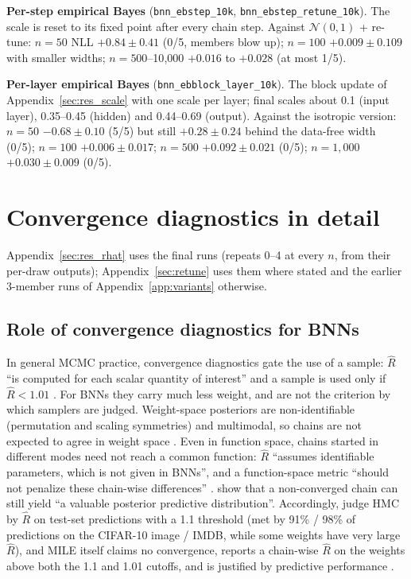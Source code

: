\documentclass[11pt]{article}
\newcommand{\nzo}{\mathcal{N}(0,1)}
\newcommand{\code}[1]{\texttt{#1}}
\begin{document}
\textbf{Per-step empirical Bayes} (\code{bnn\_ebstep\_10k}, \code{bnn\_ebstep\_retune\_10k}). The scale is reset to
its fixed point after every chain step. Against $\nzo$ + re-tune: $n=50$ NLL $+0.84\pm0.41$ (0/5, members blow up);
$n=100$ $+0.009\pm0.109$ with smaller widths; $n=500$--10{,}000 $+0.016$ to $+0.028$ (at most 1/5).

\textbf{Per-layer empirical Bayes} (\code{bnn\_ebblock\_layer\_10k}). The block update of
Appendix~\ref{sec:res_scale} with one scale per layer; final scales about 0.1 (input layer), 0.35--0.45 (hidden) and
0.44--0.69 (output). Against the isotropic version: $n=50$ $-0.68\pm0.10$ (5/5) but still $+0.28\pm0.24$ behind the
data-free width (0/5); $n=100$ $+0.006\pm0.017$; $n=500$ $+0.092\pm0.021$ (0/5); $n=1{,}000$ $+0.030\pm0.009$ (0/5).

\section{Convergence diagnostics in detail}
\label{app:diag}
Appendix~\ref{sec:res_rhat} uses the final runs (repeats 0--4 at every $n$, from their per-draw outputs);
Appendix~\ref{sec:retune} uses them where stated and the earlier 3-member runs of Appendix~\ref{app:variants} otherwise.

\subsection{Role of convergence diagnostics for BNNs}
\label{app:convrole}
In general MCMC practice, convergence diagnostics gate the
use of a sample: $\widehat R$ ``is computed for each scalar quantity of interest'' and a sample is used only if
$\widehat R<1.01$ \citep{vehtari2021rhat}. For BNNs they carry much less weight, and are not the criterion by which
samplers are judged. Weight-space posteriors are non-identifiable (permutation and scaling symmetries) and
multimodal, so chains are not expected to agree in weight space \citep{izmailov2021bnn}. Even in function space,
chains started in different modes need not reach a common function: $\widehat R$ ``assumes identifiable
parameters, which is not given in BNNs'', and a function-space metric ``should not penalize these chain-wise
differences'' \citep[Sec.~6.2]{sommer2024connecting}. \citet{papamarkou2022challenges} show that a non-converged
chain can still yield ``a valuable posterior predictive distribution''. Accordingly, \citet{izmailov2021bnn} judge
HMC by $\widehat R$ on test-set predictions with a 1.1 threshold (met by 91\% / 98\% of predictions on the CIFAR-10 image /
IMDB, while some weights have very large $\widehat R$), and MILE itself claims no convergence, reports a
chain-wise $\widehat R$ on the weights above both the 1.1 and 1.01 cutoffs, and is justified by predictive
performance \citep[App.~A.3]{sommer2025mile}.
\end{document}

